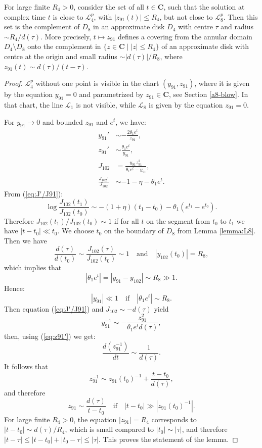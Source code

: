 \begin{lemma}\label{lemma:L4}
For large finite $R_4>0$, consider the set of all $t\in\mathbf{C}$, such that the solution at complex time $t$ is close to 
$\mathcal{L}_4^p$, with $|z_{91}(t)|\le R_4$, but not close to $\mathcal{L}_8^p$.
Then this set is the complement of $D_8$ in an approximate disk $D_4$ with centre $\tau$ and radius $\sim R_4/d(\tau)$.
More precisely, $t\mapsto z_{91}$ defines a covering from the annular domain $D_4\setminus D_8$ onto the complement in
$\{ z\in\mathbf{C}\mid |z|\le R_4\}$ of an approximate disk with centre at the origin and small radius $\sim |d(\tau)|/R_8$, where
$z_{91}(t)\sim d(\tau)/(t-\tau)$.
\end{lemma}
\begin{proof}
$\mathcal{L}_4^p$ without one point is visible in the chart $(y_{91},z_{91})$, where it is given by the equation $y_{91}=0$ and parametrized by $z_{91}\in\mathbf{C}$, see Section \ref{a8-blow}.
In that chart, the line $\mathcal{L}_1$ is not visible, while $\mathcal{L}_8$ is given by the equation $z_{91}=0$.

For $y_{91}\to0$ and bounded $z_{91}$ and $e^t$, we have:
\begin{subequations}
\begin{align}
y_{91}' &\sim-\frac{2\theta_1 e^t}{z_{91}},\label{eq:y91'}
\\
z_{91}' &\sim\frac{\theta_1 e^t}{y_{91}},\label{eq:z91'}
\\
J_{102}& = \frac{y_{91}z_{91}^2}{\theta_1 e^t-y_{91}},\label{eq:J91}
\\
\frac{J_{102}'}{J_{102}} & \sim -1-\eta -\theta_1 e^t
.\label{eq:J'/J91}
\end{align}
\end{subequations}
From (\ref{eq:J'/J91}):
$$
\log\frac{J_{102}(t_1)}{J_{102}(t_0)}\sim-(1+\eta)(t_1-t_0)-\theta_1(e^{t_1}-e^{t_0}).
$$
Therefore $J_{102}(t_1)/J_{102}(t_0)\sim1$ if for all $t$ on the segment from $t_0$ to $t_1$ we have $|t-t_0|\ll t_0$.
We choose $t_0$ on the boundary of $D_8$ from Lemma \ref{lemma:L8}.
Then we have
$$
\frac{d(\tau)}{d(t_0)}\sim\frac{J_{102}(\tau)}{J_{102}(t_0)}\sim1
\quad\text{and}\quad
|y_{102}(t_0)|=R_8,
$$
which implies that
$$
|\theta_1e^t|=|y_{91}-y_{102}|\sim R_8\gg1.
$$
Hence:
$$
|y_{91}|\ll 1
\quad\text{if}\quad
|\theta_1e^t|\sim R_8.
$$
Then equation (\ref{eq:J'/J91}) and $J_{102}\sim-d(\tau)$ yield
$$
y_{91}^{-1}\sim-\frac{z_{91}^2}{\theta_1e^t d(\tau)},
$$
then, using (\ref{eq:z91'}) we get:
$$
\frac{d(z_{91}^{-1})}{dt}\sim\frac1{d(\tau)}.
$$
It follows that
$$
z_{91}^{-1}\sim z_{91}(t_0)^{-1}+\frac{t-t_0}{d(\tau)},
$$
and therefore
$$
z_{91}\sim\frac{d(\tau)}{t-t_0}
\quad\text{if}\quad
|t-t_0|\gg|z_{91}(t_0)^{-1}|.
$$
For large finite $R_4>0$, the equation $|z_{91}|=R_4$ corresponds to $|t-t_0|\sim d(\tau)/R_4$, which is small compared to 
$|t_0|\sim|\tau|$, and therefore $|t-\tau|\le|t-t_0|+|t_0-\tau|\le|\tau|$.
This proves the statement of the lemma.
\end{proof}

